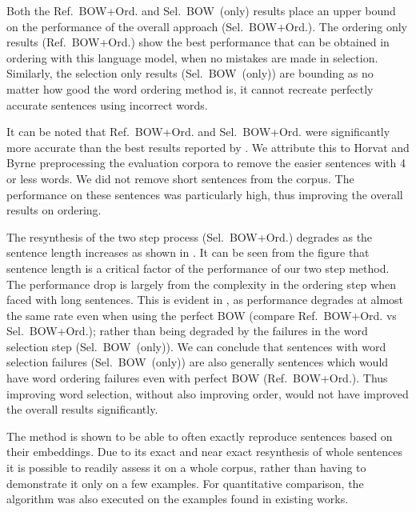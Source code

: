 \documentclass[compsoc]{IEEEtran}
\theoremstyle{plain}
\theoremstyle{definition}
\newcommand{\oracletitle}{Ref.~BOW+Ord.}
\newcommand{\selectiontitle}{Sel.~BOW~(only)}
\newcommand{\twosteptitle}{Sel.~BOW+Ord.}
\begin{document}
Both the \oracletitle{} and \selectiontitle{} results place an upper bound on the performance of the overall approach (\twosteptitle{}). The ordering only results (\oracletitle{}) show the best performance that can be obtained in ordering with this language model, when no mistakes are made in selection. Similarly, the selection only results (\selectiontitle{}) are bounding as no matter how good the word ordering method is, it cannot recreate perfectly accurate sentences using incorrect words.


It can be noted that \oracletitle{} and \twosteptitle{} were significantly more accurate than the best results reported by \textcite{Horvat2014}. We attribute this to Horvat and Byrne preprocessing the evaluation corpora to remove the easier sentences with 4 or less words. We did not remove short sentences from the corpus. The performance on these sentences was particularly high, thus improving the overall results on ordering.



The resynthesis of the two step process (\twosteptitle{}) degrades as the sentence length increases as shown in . It can be seen from the figure that sentence length is a critical factor of the performance of our two step method. The performance drop is largely from the complexity in the ordering step when faced with long sentences. This is evident in , as performance degrades at almost the same rate even when using the perfect BOW (compare \oracletitle{} vs \twosteptitle{}); rather than being degraded by the failures in the word selection step (\selectiontitle{}). We can conclude that sentences with word selection failures (\selectiontitle{}) are also generally sentences which would have word ordering failures even with perfect BOW (\oracletitle{}). Thus improving word selection, without also improving order, would not have improved the overall results significantly.


The method is shown to be able to often exactly reproduce sentences based on their embeddings.  Due to its exact and near exact resynthesis of whole sentences it is possible to readily assess it on a whole corpus, rather than having to demonstrate it only on a few examples. For quantitative comparison, the algorithm was also executed on the examples found in existing works.
\end{document}
